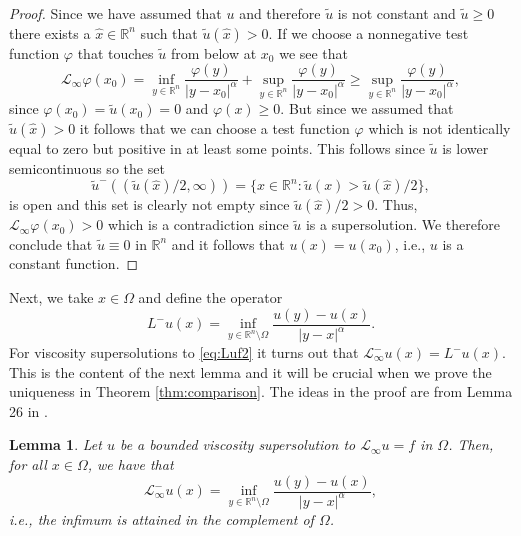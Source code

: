 \documentclass[11pt]{article}
\providecommand{\Linf}{\mathcal{L}_{\infty}}
\providecommand{\Lneg}{\mathcal{L}_{\infty}^-}
\providecommand{\Rn}{\mathbb{R}^n}
\newtheorem{lem}[thm]{Lemma}
\numberwithin{equation}{section}
\theoremstyle{definition}
\begin{document}
\begin{proof}
Since we have assumed that $u$ and therefore $\tilde{u}$ is not constant and $\tilde{u} \geq 0$ there exists a $\hat{x} \in \Rn$ such that $\tilde{u}(\hat{x}) >0.$ If we choose a nonnegative test function $\varphi$ that touches $\tilde u$ from below at $x_0$ we see that
\begin{equation*}
    \Linf \varphi(x_0) = \inf_{y \in \Rn} \frac{\varphi(y)}{|y-x_0|^{\alpha}} + \sup_{y \in \Rn} \frac{\varphi(y)}{|y-x_0|^{\alpha}} \geq \sup_{y \in \Rn} \frac{\varphi(y)}{|y-x_0|^{\alpha}},
\end{equation*}
since $\varphi(x_0)=\tilde{u}(x_0)=0$ and $\varphi(x) \geq 0$. But since we assumed that $\tilde{u}(\hat{x})>0$ it follows that we can choose a test function $\varphi$ which is not identically equal to zero but positive in at least some points. This follows since $\tilde{u}$ is lower semicontinuous so the set 
$$
\tilde{u}^-((\tilde{u}(\hat{x})/2, \infty)) = \{x \in \Rn:\tilde{u}(x)> \tilde{u}(\hat{x})/2 \},
$$
is open and this set is clearly not empty since $\tilde{u}(\hat{x})/2 >0$. Thus, $\Linf \varphi(x_0)>0$ which is a contradiction since $\tilde u$ is a supersolution. We therefore conclude that $\tilde u \equiv 0$ in $\Rn$ and it follows that $u(x)=u(x_0)$, i.e., $u$ is a constant function.
\end{proof}
Next, we take $x \in \Omega$ and define the operator
$$
L^-u(x) = \inf_{y \in \Rn \setminus \Omega} \frac{u(y)-u(x)}{|y-x|^{\alpha}}.
$$
For viscosity supersolutions to \eqref{eq:Luf2} it turns out that $\Lneg u(x) =L^- u(x)$. This is the content of the next lemma and it will be crucial when we prove the uniqueness in Theorem \ref{thm:comparison}. The ideas in the proof are from Lemma 26 in \cite{LL2012}.
\begin{lem}
\label{lem:Linfcont}
Let $u$ be a bounded viscosity supersolution to $\Linf u = f$ in $\Omega$. Then, for all $x \in \Omega$, we have that
\begin{equation}
\label{eq:Linf}
    \Lneg u(x) = \inf_{y \in \Rn \setminus \Omega} \frac{u(y)-u(x)}{|y-x|^{\alpha}},
\end{equation}
i.e., the infimum is attained in the complement of $\Omega$.
\end{lem}
\end{document}
